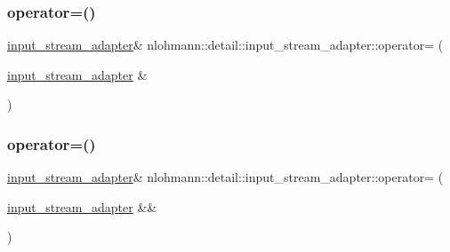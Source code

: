 \mbox{\label{classnlohmann_1_1detail_1_1input__stream__adapter_aeac5048221929b8f7558d1698dd0fb3a}} 
\subsubsection{\texorpdfstring{operator=()}{operator=()}\hspace{0.1cm}{\footnotesize\ttfamily [1/2]}}
{\footnotesize\ttfamily \mbox{\hyperlink{classnlohmann_1_1detail_1_1input__stream__adapter}{input\+\_\+stream\+\_\+adapter}}\& nlohmann\+::detail\+::input\+\_\+stream\+\_\+adapter\+::operator= (\begin{DoxyParamCaption}\item[{\mbox{\hyperlink{classnlohmann_1_1detail_1_1input__stream__adapter}{input\+\_\+stream\+\_\+adapter}} \&}]{ }\end{DoxyParamCaption})\hspace{0.3cm}{\ttfamily [delete]}}

\mbox{\label{classnlohmann_1_1detail_1_1input__stream__adapter_a3577dff99cc91968557b52959b0363e4}} 
\subsubsection{\texorpdfstring{operator=()}{operator=()}\hspace{0.1cm}{\footnotesize\ttfamily [2/2]}}
{\footnotesize\ttfamily \mbox{\hyperlink{classnlohmann_1_1detail_1_1input__stream__adapter}{input\+\_\+stream\+\_\+adapter}}\& nlohmann\+::detail\+::input\+\_\+stream\+\_\+adapter\+::operator= (\begin{DoxyParamCaption}\item[{\mbox{\hyperlink{classnlohmann_1_1detail_1_1input__stream__adapter}{input\+\_\+stream\+\_\+adapter}} \&\&}]{ }\end{DoxyParamCaption})\hspace{0.3cm}{\ttfamily [delete]}}



